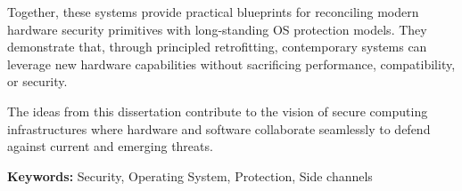 \documentclass[a4paper,11pt]{report}
\begin{document}
Together, these systems provide practical blueprints for reconciling modern hardware security primitives with long-standing OS protection models.
They demonstrate that, through principled retrofitting, contemporary systems can leverage new hardware capabilities without sacrificing performance, compatibility, or security.

The ideas from this dissertation contribute to the vision of secure computing infrastructures where hardware and software collaborate seamlessly to defend against current and emerging threats.




\textbf{Keywords:} Security, Operating System, Protection, Side channels

\newcommand{\hdr}[1]{\paragraph{#1.}\xspace{}}




% 



























% 

% 


%


%
\end{document}
